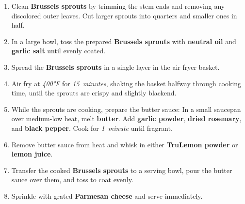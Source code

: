 \documentclass[11pt,letterpaper]{article}
\begin{document}
\begin{enumerate}
    \item Clean \textbf{Brussels sprouts} by trimming the stem ends and removing any discolored outer leaves. Cut larger sprouts into quarters and smaller ones in half.
    
    \item In a large bowl, toss the prepared \textbf{Brussels sprouts} with \textbf{neutral oil} and \textbf{garlic salt} until evenly coated.
    
    \item Spread the \textbf{Brussels sprouts} in a single layer in the air fryer basket.
    
    \item Air fry at \textit{400°F} for \textit{15~minutes}, shaking the basket halfway through cooking time, until the sprouts are crispy and slightly blackend.
    
    \item While the sprouts are cooking, prepare the butter sauce: In a small saucepan over medium-low heat, melt \textbf{butter}. Add \textbf{garlic powder}, \textbf{dried rosemary}, and \textbf{black pepper}. Cook for \textit{1~minute} until fragrant.
    
    \item Remove butter sauce from heat and whisk in either \textbf{TruLemon powder} or \textbf{lemon juice}.
    
    \item Transfer the cooked \textbf{Brussels sprouts} to a serving bowl, pour the butter sauce over them, and toss to coat evenly.
    
    \item Sprinkle with grated \textbf{Parmesan cheese} and serve immediately.
\end{enumerate}

\newpage
\end{document}
